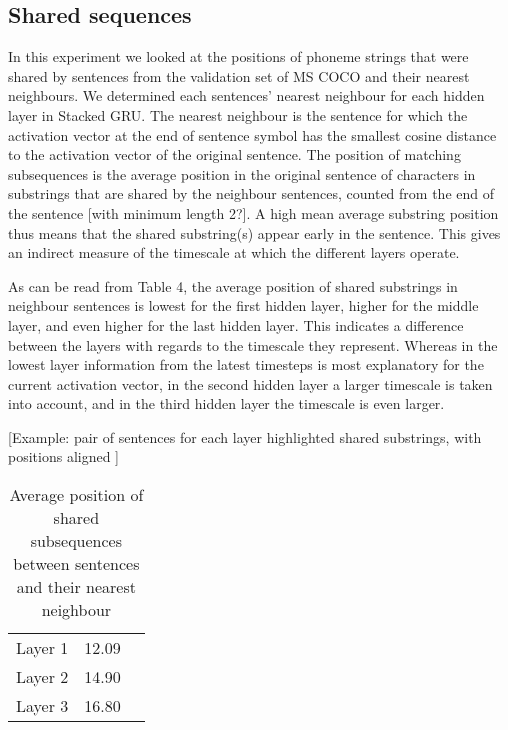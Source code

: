 \subsection{Shared sequences}
In this experiment we looked at the positions of phoneme strings that were shared by sentences from the validation set of MS COCO and their nearest neighbours. We determined each sentences' nearest neighbour for each hidden layer in {\sc Stacked GRU}. The nearest neighbour is the sentence for which the activation vector at the end of sentence symbol has the smallest cosine distance to the activation vector of the original sentence. The position of matching subsequences is the average position in the original sentence of characters in substrings that are shared by the neighbour sentences, counted from the end of the sentence [with minimum length 2?]. A high mean average substring position thus means that the shared substring(s) appear early in the sentence. This gives an indirect measure of the timescale at which the different layers operate. 

As can be read from Table 4, the average position of shared substrings in neighbour sentences is lowest for the first hidden layer, higher for the middle layer, and even higher for the last hidden layer. This indicates a difference between the layers with regards to the timescale they represent. Whereas in the lowest layer information from the latest timesteps is most explanatory for the current activation vector, in the second hidden layer a larger timescale is taken into account, and in the third hidden layer the timescale is even larger. 

[Example: pair of sentences for each layer
highlighted shared substrings, with positions aligned ]

\begin{table}[]
	\centering
	\begin{tabular}{ccc}
		Layer 1 & 12.09 \\
		Layer 2 & 14.90 \\
		Layer 3 & 16.80
	\end{tabular}
	\caption{Average position of shared subsequences between sentences and their nearest neighbour}
\end{table}